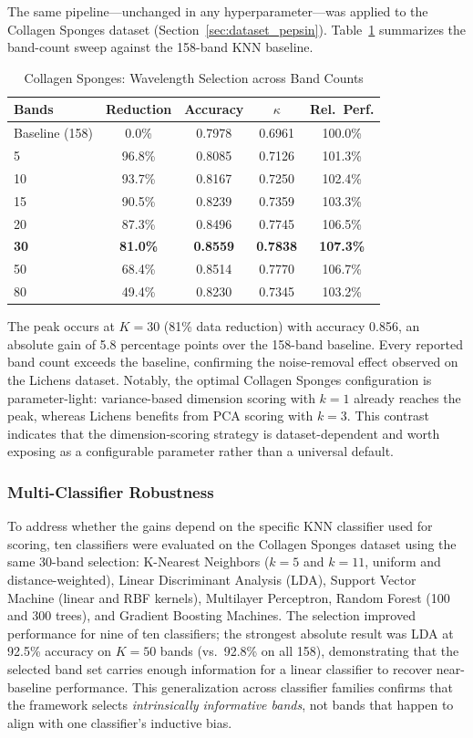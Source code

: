 The same pipeline---unchanged in any hyperparameter---was applied to the Collagen Sponges dataset (Section~\ref{sec:dataset_pepsin}).
Table~\ref{tab:pepsin_results} summarizes the band-count sweep against the 158-band KNN baseline.

\begin{table}[!t]
\centering
\caption{Collagen Sponges: Wavelength Selection across Band Counts}
\label{tab:pepsin_results}
\begin{tabular}{@{}lcccc@{}}
\toprule
\textbf{Bands} & \textbf{Reduction} & \textbf{Accuracy} & \textbf{$\kappa$} & \textbf{Rel.\ Perf.} \\
\midrule
Baseline (158) & 0.0\% & 0.7978 & 0.6961 & 100.0\% \\
\midrule
5 & 96.8\% & 0.8085 & 0.7126 & 101.3\% \\
10 & 93.7\% & 0.8167 & 0.7250 & 102.4\% \\
15 & 90.5\% & 0.8239 & 0.7359 & 103.3\% \\
20 & 87.3\% & 0.8496 & 0.7745 & 106.5\% \\
\textbf{30} & \textbf{81.0\%} & \textbf{0.8559} & \textbf{0.7838} & \textbf{107.3\%} \\
50 & 68.4\% & 0.8514 & 0.7770 & 106.7\% \\
80 & 49.4\% & 0.8230 & 0.7345 & 103.2\% \\
\bottomrule
\end{tabular}
\end{table}

The peak occurs at $K=30$ (81\% data reduction) with accuracy 0.856, an absolute gain of 5.8 percentage points over the 158-band baseline.
Every reported band count exceeds the baseline, confirming the noise-removal effect observed on the Lichens dataset.
Notably, the optimal Collagen Sponges configuration is parameter-light: variance-based dimension scoring with $k=1$ already reaches the peak, whereas Lichens benefits from PCA scoring with $k=3$.
This contrast indicates that the dimension-scoring strategy is dataset-dependent and worth exposing as a configurable parameter rather than a universal default.

\subsubsection{Multi-Classifier Robustness}
To address whether the gains depend on the specific KNN classifier used for scoring, ten classifiers were evaluated on the Collagen Sponges dataset using the same 30-band selection: K-Nearest Neighbors ($k\!=\!5$ and $k\!=\!11$, uniform and distance-weighted), Linear Discriminant Analysis (LDA), Support Vector Machine (linear and RBF kernels), Multilayer Perceptron, Random Forest (100 and 300 trees), and Gradient Boosting Machines.
The selection improved performance for nine of ten classifiers; the strongest absolute result was LDA at 92.5\% accuracy on $K\!=\!50$ bands (vs.\ 92.8\% on all 158), demonstrating that the selected band set carries enough information for a linear classifier to recover near-baseline performance.
This generalization across classifier families confirms that the framework selects \emph{intrinsically informative bands}, not bands that happen to align with one classifier's inductive bias.

